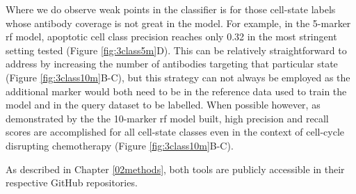 Where we do observe weak points in the classifier is for those cell-state labels whose antibody coverage is not great in the model. For example, in the 5-marker \acrshort{rf} model, apoptotic cell class precision reaches only 0.32 in the most stringent setting tested (Figure \ref{fig:3class5m}D). This can be relatively straightforward to address by increasing the number of antibodies targeting that particular state (Figure \ref{fig:3class10m}B-C), but this strategy can not always be employed as the additional marker would both need to be in the reference data used to train the model and in the query dataset to be labelled. When possible however, as demonstrated by the the 10-marker \acrshort{rf} model built, high precision and recall scores are accomplished for all cell-state classes even in the context of cell-cycle disrupting chemotherapy (Figure \ref{fig:3class10m}B-C).

As described in Chapter \ref{02methods}, both tools are publicly accessible in their respective GitHub repositories.